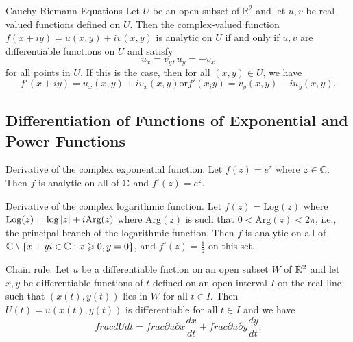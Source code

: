 \documentclass[11pt,reqno,oneside,a4paper]{article}
\begin{document}
\begin{thm}{Cauchy-Riemann Equations}
Let $U$ be an open subset of $\mathbb{R}^2$ and let $u,v$ be real-valued functions defined on $U.$ Then the complex-valued function $f(x+iy) = u(x,y) + iv(x,y)$ is analytic on $U$ if and only if $u,v$ are differentiable functions on $U$ and satisfy $$u_x=v_y, u_y = -v_x$$ for all points in $U$. If this is the case, then for all $(x,y)\in U$, we have $$f'(x+iy) = u_x(x,y)+iv_x(x,y) \text{or} f'(x_iy) = v_y(x,y) - iu_y(x,y).$$
\end{thm}




\subsection{Differentiation of Functions of Exponential and Power Functions}

\begin{thm}{Derivative of the complex exponential function.}
Let $f(z) = e^z$ where $z\in\mathbb C.$ Then $f$ is analytic on all of $\mathbb C$ and $f'(z) = e^z.$
\end{thm}


\begin{thm}{Derivative of the complex logarithmic function.}
Let $f(z)=\text{Log}(z)$ where $\text{Log}(z)=\text{log}\left\lvert z\right\rvert+i\text{Arg}(z)$ where Arg$(z)$ is such that $0< \text{Arg}(z)<2\pi$, i.e., the principal branch of the logarithmic function.
Then $f$ is analytic on all of $\mathbb C \setminus \{x+yi \in \mathbb C : x \geqslant 0, y = 0\}$, and $f'(z)=\frac{1}{z}$ on this set.
\end{thm}

\begin{thm}{Chain rule.}
Let $u$ be a differentiable fnction on an open subset $W$ of $\mathbb R^2$ and let $x,y$ be differentiable functions of $t$ defined on an open interval $I$ on the real line such that $(x(t),y(t))$ lies in $W$ for all $t \in I.$ 
Then $U(t) = u(x(t),y(t))$ is differentiable for all $t \in I$ and we have 
$$ frac{dU}{dt} = frac{\partial u}{\partial x} \frac{dx}{dt} + frac{\partial u}{\partial y} \frac{dy}{dt}.$$
\end{thm}
\end{document}

